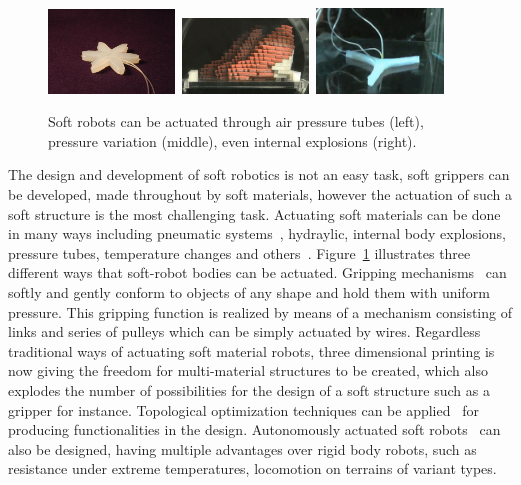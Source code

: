 \begin{figure}[t!]
\centering
\includegraphics[width=0.3\textwidth,height=0.13\textheight]{../Figures/Misc/soft_robotics_figure.png}\		
\includegraphics[width=0.3\textwidth,height=0.13\textheight]{../Figures/Misc/hillerPressureChamber.png}\	
\includegraphics[width=0.3\textwidth,height=0.13\textheight]{../Figures/Misc/ExplodingRobot.jpg}\\
\caption{Soft robots can be actuated through air pressure tubes (left), pressure variation (middle), even internal explosions (right).}
\label{fig:softRobotsActuation}
\end{figure}

The design and development of soft robotics is not an easy task, soft grippers can be developed, made throughout by soft materials, however the actuation of such a soft structure is the most challenging task. Actuating soft materials can be done in many ways including pneumatic systems~\cite{ilievski2011soft, shepherd2011multigait}, hydraylic, internal body explosions, pressure tubes, temperature changes and others~\cite{laschi2012soft, seok2010peristaltic}. Figure~\ref{fig:softRobotsActuation} illustrates three different ways that soft-robot bodies can be actuated. Gripping mechanisms~\cite{hirose1978development} can softly and gently conform to objects of any shape and hold them with uniform pressure. This gripping function is realized by means of a mechanism consisting of links and series of pulleys which can be simply actuated by wires. Regardless traditional ways of actuating soft material robots, three dimensional printing is now giving the freedom for multi-material structures to be created, which also explodes the number of possibilities for the design of a soft structure such as a gripper for instance. Topological optimization techniques can be applied~\cite{hiller2009multi} for producing functionalities in the design. Autonomously actuated soft robots~\cite{tolleyresilient} can also be designed, having multiple advantages over rigid body robots, such as resistance under extreme temperatures, locomotion on terrains of variant types. 

